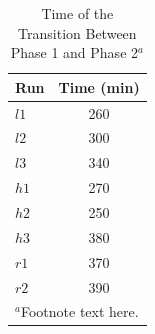 \documentclass[draft]{agujournal2019}
\begin{document}
%
%
 \begin{table}
 \caption{Time of the Transition Between Phase 1 and Phase 2$^{a}$}
 \centering
 \begin{tabular}{l c}
 \hline
  Run  & Time (min)  \\
 \hline
   $l1$  & 260   \\
   $l2$  & 300   \\
   $l3$  & 340   \\
   $h1$  & 270   \\
   $h2$  & 250   \\
   $h3$  & 380   \\
   $r1$  & 370   \\
   $r2$  & 390   \\
 \hline
 \multicolumn{2}{l}{$^{a}$Footnote text here.}
 \end{tabular}
 \end{table}

%
%



%
%
%
%
\end{document}
